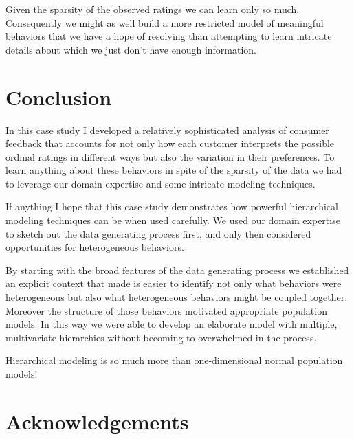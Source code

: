 \documentclass[
  letterpaper,
  DIV=11,
  numbers=noendperiod]{scrartcl}
\begin{document}
Given the sparsity of the observed ratings we can learn only so much.
Consequently we might as well build a more restricted model of
meaningful behaviors that we have a hope of resolving than attempting to
learn intricate details about which we just don't have enough
information.

\section{Conclusion}\label{conclusion}

In this case study I developed a relatively sophisticated analysis of
consumer feedback that accounts for not only how each customer
interprets the possible ordinal ratings in different ways but also the
variation in their preferences. To learn anything about these behaviors
in spite of the sparsity of the data we had to leverage our domain
expertise and some intricate modeling techniques.

If anything I hope that this case study demonstrates how powerful
hierarchical modeling techniques can be when used carefully. We used our
domain expertise to sketch out the data generating process first, and
only then considered opportunities for heterogeneous behaviors.

By starting with the broad features of the data generating process we
established an explicit context that made is easier to identify not only
what behaviors were heterogeneous but also what heterogeneous behaviors
might be coupled together. Moreover the structure of those behaviors
motivated appropriate population models. In this way we were able to
develop an elaborate model with multiple, multivariate hierarchies
without becoming to overwhelmed in the process.

Hierarchical modeling is so much more than one-dimensional normal
population models!

\section*{Acknowledgements}\label{acknowledgements}
\end{document}
